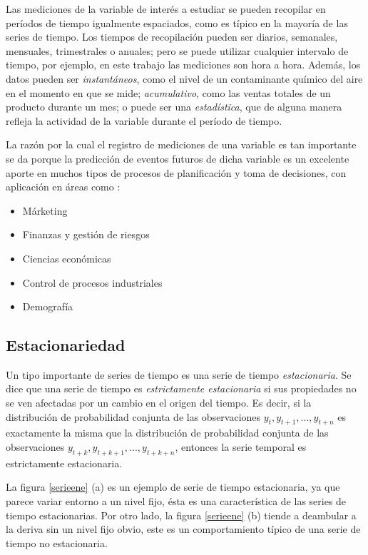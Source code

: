 Las mediciones de la variable de interés a estudiar se pueden recopilar en períodos de tiempo igualmente espaciados, como es típico en la mayoría de las series de tiempo. Los tiempos de recopilación pueden ser diarios, semanales, mensuales, trimestrales o anuales; pero se puede utilizar cualquier intervalo de tiempo, por ejemplo, en este trabajo las mediciones son hora a hora. Además, los datos pueden ser \textit{instantáneos}, como el nivel de un contaminante químico del aire en el momento en que se mide; \textit{acumulativo}, como las ventas totales de un producto durante un mes; o puede ser una \textit{estadística}, que de alguna manera refleja la actividad de la variable durante el período de tiempo.

La razón por la cual el registro de mediciones de una variable es tan importante se da porque la predicción de eventos futuros de dicha variable es un excelente aporte en muchos tipos de procesos de planificación y toma de decisiones, con aplicación en áreas como \citep{montgomery}:

\begin{itemize}
\item Márketing
\item Finanzas y gestión de riesgos
\item Ciencias económicas
\item Control de procesos industriales
\item Demografía
\end{itemize}

\subsection{Estacionariedad}

Un tipo importante de series de tiempo es una serie de tiempo \textit{estacionaria}. Se dice que una serie de tiempo es \textit{estrictamente estacionaria} si sus propiedades no se ven afectadas por un cambio en el origen del tiempo. Es decir, si la distribución de probabilidad conjunta de las observaciones $y_{t}, y_{t+1}, ..., y_{t+n}$ es exactamente la misma que la distribución de probabilidad conjunta de las observaciones $y_{t+k}, y_{t+k+1}, ..., y_{t+k+n}$, entonces la serie temporal es estrictamente estacionaria.

La figura \ref{serieene} (a) es un ejemplo de serie de tiempo estacionaria, ya que parece variar entorno a un nivel fijo, ésta es una característica de las series de tiempo estacionarias. Por otro lado, la figura \ref{serieene} (b) tiende a deambular a la deriva sin un nivel fijo obvio, este es un comportamiento típico de una serie de tiempo no estacionaria.

